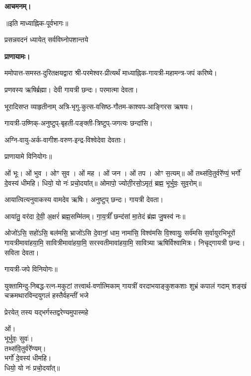 \textbf{आचमनम्।}


\centerline{॥इति माध्याह्निक-पूर्वभागः॥}



{प्रसन्नवदनं ध्यायेत् सर्वविघ्नोपशान्तये}

\textbf{प्राणायामः।}

ममोपात्त-समस्त-दुरितक्षयद्वारा श्री-परमेश्वर-प्रीत्यर्थं माध्याह्निक-गायत्री-महामन्त्र-जपं करिष्ये।


प्रणवस्य ऋषिर्ब्रह्मा।
देवी गायत्री छन्दः।
परमात्मा देवता।

भूरादिसप्त व्याहृतीनाम् अत्रि-भृगु-कुत्स-वसिष्ठ-गौतम-काश्यप-आङ्गिरस ऋषयः।

गायत्री-उष्णिक्-अनुष्टुप्-बृहती-पङ्क्ती-त्रिष्टुप्-जगत्यः छन्दांसि।

अग्नि-वायु-अर्क-वागीश-वरुण-इन्द्र-विश्वेदेवा देवताः।
      
प्राणायामे विनियोगः॥


ओं भूः। ओं भुव। ओꣳ सुव। ओं मह। ओं जन। ओं तप। ओꣳ स॒त्यम्॥
ओं तथ्स॑वि॒तुर्वरे᳚ण्यं॒ भर्गो॑ दे॒वस्य॑ धीमहि। धियो॒ यो नः॑ प्रचो॒दया᳚त्॥
ओमापो॒ ज्योती॒रसो॒ऽमृतं॒ ब्रह्म॒ भूर्भुवः॒ सुव॒रोम्॥




आयात्वित्यनुवाकस्य वामदेव ऋषिः।
अनुष्टुप् छन्दः।
गायत्री देवता।

आया॑तु॒ वर॑दा दे॒वी॒ अ॒क्षरं॑ ब्रह्म॒सम्मि॑तम्। गा॒य॒त्रीं᳚ छन्द॑सां मा॒तेदं ब्र॑ह्म जु॒षस्व॑ नः॥

ओजो॑ऽसि॒ सहो॑ऽसि॒ बल॑मसि॒ भ्राजो॑ऽसि दे॒वानां॒ धाम॒ नामा॑सि॒ विश्व॑मसि वि॒श्वायुः॒ सर्व॑मसि स॒र्वायुरभिभूरों गायत्रीमावा॑हया॒मि॒ सावित्रीमावा॑हया॒मि॒ सरस्वतीमावा॑ह\-या॒मि॒ सावित्र्या ऋषिर्विश्वामित्रः। निचृद्गायत्री छन्दः। सविता देवता।

गायत्री-जपे विनियोगः॥



{युक्तामिन्दु-निबद्ध-रत्न-मकुटां तत्त्वार्थ-वर्णात्मिकाम्}
{गायत्रीं वरदाभयाङ्कुशकशाः शुभ्रं कपालं गदाम्}
{शङ्खं चक्रमथारविन्दयुगलं हस्तैर्वहन्तीं भजे}

{प्रेरयेत् तस्य यद्भर्गस्तद्वरेण्यमुपास्महे}


ओं।\\
भूर्भुवः॒ सुवः॑।\\
तथ्स॑वि॒तुर्वरे᳚ण्यम्।\\
भर्गो॑ दे॒वस्य॑ धीमहि।\\
धियो॒ यो नः॑ प्रचो॒दया᳚त्॥

